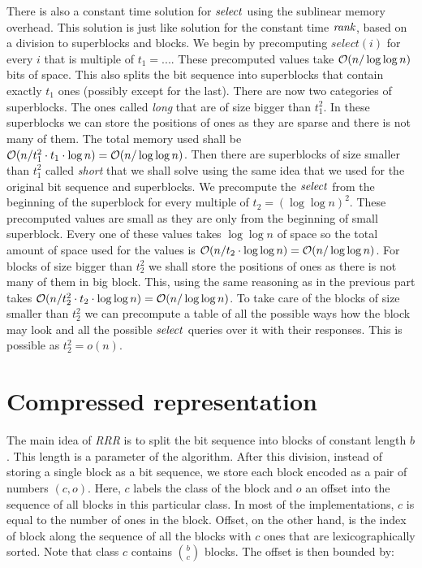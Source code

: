 There is also a constant time solution for $\mathit{select}$ using the sublinear memory overhead.
This solution is just like solution for the constant time $\mathit{rank}$, based on a division
to superblocks and blocks. We begin by precomputing $select(i)$ for every $i$ that is
multiple of $t_1=...$. These precomputed values take $\mathcal{O}(n/\log\log n)$ bits of space.
This also splits the bit sequence into superblocks that contain exactly $t_1$ ones (possibly
except for the last). There are
now two categories of superblocks. The ones called \textit{long} that are of size bigger
than $t_1^2$. In these superblocks we can store the positions of ones as they are sparse
and there is not many of them. The total memory used shall be $\mathcal{O}(n/t_1^2\cdot t_1\cdot
\log n) = \mathcal{O}(n/\log\log n)$. Then there are superblocks of size smaller than $t_1^2$ called
\textit{short} that we shall solve using the same idea that we used for the original bit sequence
and superblocks. We precompute the $\mathit{select}$ from the beginning of the superblock for every
multiple of $t_2=(\log\log n)^2$. These precomputed values are small as they are only from the
beginning of small superblock. Every one of these values takes $\log\log n$ of space so the
total amount of space used for the values is $\mathcal{O}(n/t_2\cdot \log\log n) = \mathcal{O}(n/\log\log n)$.
For blocks of size bigger than $t_2^2$ we shall store the positions of ones as there is not
many of them in big block. This, using the same reasoning as in the previous part takes
$\mathcal{O}(n/t_2^2\cdot t_2\cdot \log\log n) = \mathcal{O}(n/\log\log n)$. To take care of the
blocks of size smaller than $t_2^2$ we can precompute a table of all the possible ways how
the block may look and all the possible $\mathit{select}$ queries over it with their responses.
This is possible as $t_2^2 = o(n)$.

\section{Compressed representation}
\label{section:compressed_bv}

The main idea of \textit{RRR} is to split the bit sequence into blocks of constant length
$b$. This length is a parameter of the algorithm. After this division, instead
of storing a single block as a bit sequence, we store each block encoded as a pair
of numbers $(c, o)$. Here, $c$ labels the class of the block and $o$ an offset into
the sequence of all blocks in this particular class. In most of the implementations,
$c$ is equal to the number of ones in the block. Offset, on the other hand, is the
index of block along the sequence of all the blocks with $c$ ones that are lexicographically
sorted. Note that class $c$ contains ${b\choose c}$ blocks. The offset is then bounded by:

